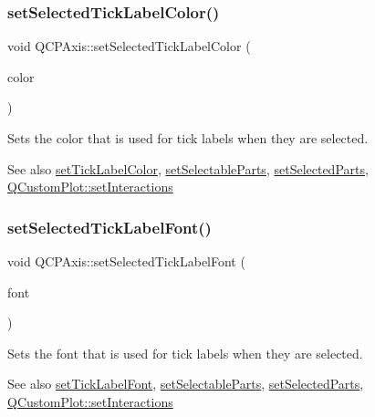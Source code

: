 \subsubsection{\texorpdfstring{set\+Selected\+Tick\+Label\+Color()}{setSelectedTickLabelColor()}}
{\footnotesize\ttfamily void Q\+C\+P\+Axis\+::set\+Selected\+Tick\+Label\+Color (\begin{DoxyParamCaption}\item[{const Q\+Color \&}]{color }\end{DoxyParamCaption})}

Sets the color that is used for tick labels when they are selected.

\begin{DoxySeeAlso}{See also}
\hyperlink{class_q_c_p_axis_a395e445c3fe496b935bee7b911ecfd1c}{set\+Tick\+Label\+Color}, \hyperlink{class_q_c_p_axis_a513f9b9e326c505d9bec54880031b085}{set\+Selectable\+Parts}, \hyperlink{class_q_c_p_axis_ab9d7a69277dcbed9119b3c1f25ca19c3}{set\+Selected\+Parts}, \hyperlink{class_q_custom_plot_a5ee1e2f6ae27419deca53e75907c27e5}{Q\+Custom\+Plot\+::set\+Interactions} 
\end{DoxySeeAlso}
\mbox{\label{class_q_c_p_axis_a845ccb560b7bc5281098a5be494145f6}} 
\subsubsection{\texorpdfstring{set\+Selected\+Tick\+Label\+Font()}{setSelectedTickLabelFont()}}
{\footnotesize\ttfamily void Q\+C\+P\+Axis\+::set\+Selected\+Tick\+Label\+Font (\begin{DoxyParamCaption}\item[{const Q\+Font \&}]{font }\end{DoxyParamCaption})}

Sets the font that is used for tick labels when they are selected.

\begin{DoxySeeAlso}{See also}
\hyperlink{class_q_c_p_axis_a2b8690c4e8dbc39d9185d2b398ce7a6c}{set\+Tick\+Label\+Font}, \hyperlink{class_q_c_p_axis_a513f9b9e326c505d9bec54880031b085}{set\+Selectable\+Parts}, \hyperlink{class_q_c_p_axis_ab9d7a69277dcbed9119b3c1f25ca19c3}{set\+Selected\+Parts}, \hyperlink{class_q_custom_plot_a5ee1e2f6ae27419deca53e75907c27e5}{Q\+Custom\+Plot\+::set\+Interactions} 
\end{DoxySeeAlso}
\mbox{\label{class_q_c_p_axis_a8360502685eb782edbf04019c9345cdc}} 
